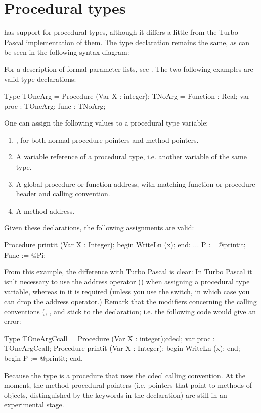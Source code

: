 \documentclass{report}
\begin{document}
\section{Procedural types}
\fpc has support for procedural types, although it differs a little from 
the Turbo Pascal implementation of them. The type declaration remains the
same, as can be seen in the following syntax diagram:

For a description of formal parameter lists, see .
The two following examples are valid type declarations:
\begin{listing}
Type TOneArg = Procedure (Var X : integer);
     TNoArg = Function : Real;
var proc : TOneArg;
    func : TNoArg;
\end{listing}
One can assign the following values to a procedural type variable:
\begin{enumerate}
\item {}, for both normal procedure pointers and method pointers.
\item A variable reference of a procedural type, i.e. another variable of
the same type.
\item A global procedure or function address, with matching function or
procedure header and calling convention.
\item A method address.
\end{enumerate}
Given these declarations, the following assignments are valid:
\begin{listing}
Procedure printit (Var X : Integer);
begin
  WriteLn (x);
end;
...
P := @printit;
Func := @Pi;
\end{listing}
From this example, the difference with Turbo Pascal is clear: In Turbo
Pascal it isn't necessary to use the address operator () 
when assigning a procedural type variable, whereas in \fpc it is required
(unless you use the  switch, in which case you can drop the address
operator.)
Remark that the modifiers concerning the calling conventions (,
,  and  stick to the declaration;
i.e. the following code would give an error:
\begin{listing}
Type TOneArgCcall = Procedure (Var X : integer);cdecl;
var proc : TOneArgCcall;
Procedure printit (Var X : Integer);
begin
  WriteLn (x);
end;
begin
P := @printit;
end.
\end{listing}
Because the  type is a procedure that uses the cdecl
calling convention. 
At the moment, the method procedural pointers (i.e. pointers that point to
methods of objects, distinguished by the  keywords in the
declaration) are still in an experimental stage.
\end{document}
